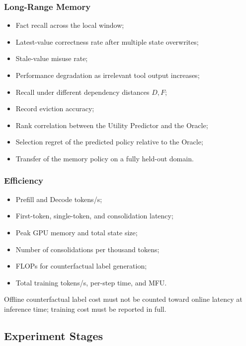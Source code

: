 \subsubsection{Long-Range Memory}

\begin{itemize}
  \item Fact recall across the local window;
  \item Latest-value correctness rate after multiple state overwrites;
  \item Stale-value misuse rate;
  \item Performance degradation as irrelevant tool output increases;
  \item Recall under different dependency distances $D,F$;
  \item Record eviction accuracy;
  \item Rank correlation between the Utility Predictor and the Oracle;
  \item Selection regret of the predicted policy relative to the Oracle;
  \item Transfer of the memory policy on a fully held-out domain.
\end{itemize}

\subsubsection{Efficiency}

\begin{itemize}
  \item Prefill and Decode tokens/s;
  \item First-token, single-token, and consolidation latency;
  \item Peak GPU memory and total state size;
  \item Number of consolidations per thousand tokens;
  \item FLOPs for counterfactual label generation;
  \item Total training tokens/s, per-step time, and MFU.
\end{itemize}

Offline counterfactual label cost must not be counted toward online latency at inference time; training cost must be reported in full.

\subsection{Experiment Stages}

